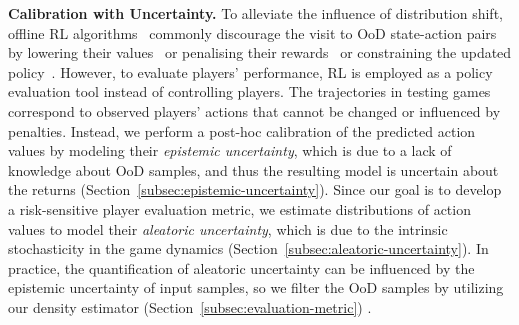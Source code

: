 \documentclass{article}
\newcommand{\dataset}{\mathcal{D}}
\begin{document}

\noindent\textbf{Calibration with Uncertainty.}
To alleviate the influence of distribution shift, offline RL algorithms~\cite{Levine2020OfflineRL} commonly discourage the visit to OoD state-action pairs by lowering their values~\cite{Kumar2020CQL} or penalising their rewards~\cite{Yu2020MOPO} or constraining the updated policy~\cite{Fujimoto2019OffPolicy,Kumar2019Stable}. However, to evaluate players' performance, RL is employed as a policy evaluation tool instead of controlling players. The trajectories in testing games correspond to observed players' actions that cannot be changed or influenced by penalties. Instead, we perform a post-hoc calibration of the predicted action values by modeling their {\it epistemic uncertainty}, which is due to a lack of knowledge about OoD samples, and thus the resulting model is uncertain about the returns (Section~\ref{subsec:epistemic-uncertainty}). Since our goal is to develop a risk-sensitive player evaluation metric, we estimate distributions of action values to model their {\it aleatoric uncertainty}, which is due to the intrinsic stochasticity in the game dynamics (Section~\ref{subsec:aleatoric-uncertainty}).
In practice, the quantification of aleatoric uncertainty can be influenced by the epistemic uncertainty of input samples, so we filter the OoD samples by utilizing our density estimator (Section~\ref{subsec:evaluation-metric}) .
\end{document}
